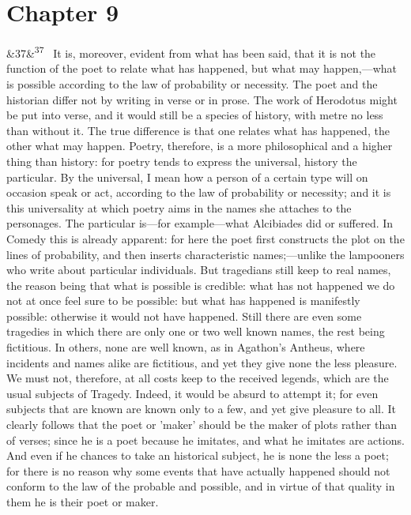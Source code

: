 \documentclass[12pt]{article}
\newcommand{\para}[1][]{\par\noindent\ifx&#1&\else\textsuperscript{\footnotesize #1}~\fi}
\begin{document}
\section*{Chapter 9}

\para[37] It is, moreover, evident from what has been said, that it is not the function of the poet to relate what has happened, but what may happen,---what is possible according to the law of probability or necessity. The poet and the historian differ not by writing in verse or in prose. The work of Herodotus might be put into verse, and it would still be a species of history, with metre no less than without it. The true difference is that one relates what has happened, the other what may happen. Poetry, therefore, is a more philosophical and a higher thing than history: for poetry tends to express the universal, history the particular. By the universal, I mean how a person of a certain type will on occasion speak or act, according to the law of probability or necessity; and it is this universality at which poetry aims in the names she attaches to the personages. The particular is---for example---what Alcibiades did or suffered. In Comedy this is already apparent: for here the poet first constructs the plot on the lines of probability, and then inserts characteristic names;---unlike the lampooners who write about particular individuals. But tragedians still keep to real names, the reason being that what is possible is credible: what has not happened we do not at once feel sure to be possible: but what has happened is manifestly possible: otherwise it would not have happened. Still there are even some tragedies in which there are only one or two well known names, the rest being fictitious. In others, none are well known, as in Agathon's Antheus, where incidents and names alike are fictitious, and yet they give none the less pleasure. We must not, therefore, at all costs keep to the received legends, which are the usual subjects of Tragedy. Indeed, it would be absurd to attempt it; for even subjects that are known are known only to a few, and yet give pleasure to all. It clearly follows that the poet or 'maker' should be the maker of plots rather than of verses; since he is a poet because he imitates, and what he imitates are actions. And even if he chances to take an historical subject, he is none the less a poet; for there is no reason why some events that have actually happened should not conform to the law of the probable and possible, and in virtue of that quality in them he is their poet or maker.
\end{document}
